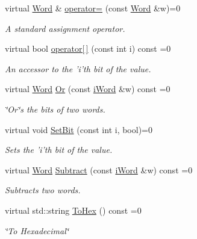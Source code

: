 \begin{DoxyCompactItemize}
virtual \hyperlink{classWord}{Word} \& \hyperlink{classiWord_aaee78600a625153a8282bcec181d0a24}{operator=} (const \hyperlink{classWord}{Word} \&w)=0
\begin{DoxyCompactList}\small\item\em A standard assignment operator. \item\end{DoxyCompactList}\item 
virtual bool \hyperlink{classiWord_a0e83901b08763247527ce61c89fd847f}{operator\mbox{[}$\,$\mbox{]}} (const int i) const =0
\begin{DoxyCompactList}\small\item\em An accessor to the 'i'th bit of the value. \item\end{DoxyCompactList}\item 
virtual \hyperlink{classWord}{Word} \hyperlink{classiWord_a2f57b8b8739d1ce6c043494696a9f685}{Or} (const \hyperlink{classiWord}{iWord} \&w) const =0
\begin{DoxyCompactList}\small\item\em \char`\"{}Or\char`\"{}s the bits of two words. \item\end{DoxyCompactList}\item 
virtual void \hyperlink{classiWord_a6442bd382be2d072d6243cfcb9dd2312}{SetBit} (const int i, bool)=0
\begin{DoxyCompactList}\small\item\em Sets the 'i'th bit of the value. \item\end{DoxyCompactList}\item 
virtual \hyperlink{classWord}{Word} \hyperlink{classiWord_a8e2da1fb4c3ffcc78e1d94f1798797ec}{Subtract} (const \hyperlink{classiWord}{iWord} \&w) const =0
\begin{DoxyCompactList}\small\item\em Subtracts two words. \item\end{DoxyCompactList}\item 
virtual std::string \hyperlink{classiWord_a7d7cb4facca44fc785899d01e47f29b1}{ToHex} () const =0
\begin{DoxyCompactList}\small\item\em \char`\"{}To Hexadecimal\char`\"{} \item\end{DoxyCompactList}\item 

\end{DoxyCompactItemize}
